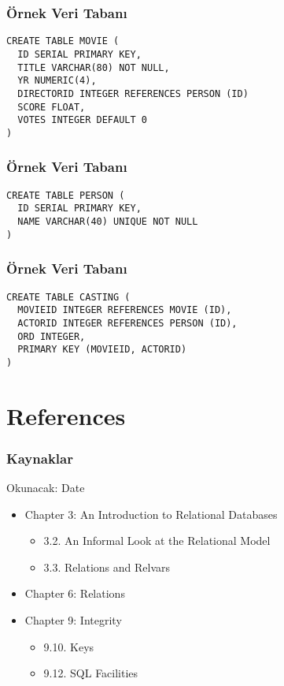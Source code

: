 \documentclass[dvipsnames]{beamer}
\theoremstyle{plain}
\begin{document}
\begin{frame}[fragile]
  \frametitle{Örnek Veri Tabanı}

  \begin{lstlisting}
CREATE TABLE MOVIE (
  ID SERIAL PRIMARY KEY,
  TITLE VARCHAR(80) NOT NULL,
  YR NUMERIC(4),
  DIRECTORID INTEGER REFERENCES PERSON (ID)
  SCORE FLOAT,
  VOTES INTEGER DEFAULT 0
)
  \end{lstlisting}
\end{frame}

\begin{frame}[fragile]
  \frametitle{Örnek Veri Tabanı}

  \begin{lstlisting}
CREATE TABLE PERSON (
  ID SERIAL PRIMARY KEY,
  NAME VARCHAR(40) UNIQUE NOT NULL
)
  \end{lstlisting}
\end{frame}

\begin{frame}[fragile]
  \frametitle{Örnek Veri Tabanı}

  \begin{lstlisting}
CREATE TABLE CASTING (
  MOVIEID INTEGER REFERENCES MOVIE (ID),
  ACTORID INTEGER REFERENCES PERSON (ID),
  ORD INTEGER,
  PRIMARY KEY (MOVIEID, ACTORID)
)
  \end{lstlisting}
\end{frame}

\section*{References}

\begin{frame}
  \frametitle{Kaynaklar}

  \begin{block}{Okunacak: Date}
    \begin{itemize}
      \item Chapter 3: An Introduction to Relational Databases
      \begin{itemize}
        \item 3.2. \alert{An Informal Look at the Relational Model}
        \item 3.3. \alert{Relations and Relvars}
      \end{itemize}

      \item Chapter 6: \alert{Relations}

      \item Chapter 9: Integrity
      \begin{itemize}
        \item 9.10. \alert{Keys}
        \item 9.12. \alert{SQL Facilities}
      \end{itemize}
    \end{itemize}
  \end{block}
\end{frame}
\end{document}
